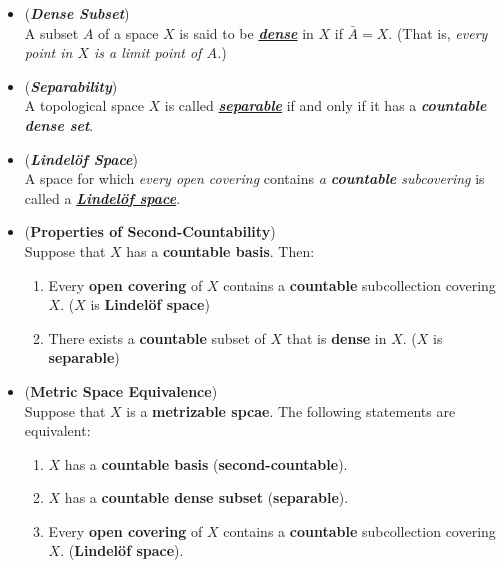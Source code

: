 \documentclass[11pt]{article}
\begin{document}
\begin{itemize}
\item \begin{definition} (\emph{\textbf{Dense Subset}})\\
A subset $A$ of a space $X$ is said to be \underline{\emph{\textbf{dense}}} in $X$ if $\bar{A}=X$. (That is, \emph{every point in $X$ is a limit point of $A$.})
\end{definition}

\item \begin{definition} (\emph{\textbf{Separability}})\\
A topological space $X$ is called \underline{\emph{\textbf{separable}}} if and only if it has a \emph{\textbf{countable dense set}}.
\end{definition}

\item \begin{definition} (\emph{\textbf{Lindel{\"o}f Space}})\\
A space for which \emph{every open covering} contains \emph{a \textbf{countable} subcovering} is called a \underline{\emph{\textbf{Lindel{\"o}f space}}}. 
\end{definition}

\item \begin{proposition} (\textbf{Properties of Second-Countability}) \citep{munkres2000topology}\\
Suppose that $X$ has a \textbf{countable basis}. Then:
\begin{enumerate}
\item Every \textbf{open covering} of $X$ contains a \textbf{countable} subcollection covering $X$. ($X$ is \textbf{Lindel{\"o}f space})
\item There exists a \textbf{countable} subset of $X$ that is \textbf{dense} in $X$. ($X$ is \textbf{separable})
\end{enumerate}
\end{proposition}

\item \begin{proposition}  (\textbf{Metric Space Equivalence}) \citep{munkres2000topology}\\
Suppose that $X$ is a \textbf{metrizable spcae}. The following statements are equivalent: 
\begin{enumerate}
\item $X$ has a \textbf{countable basis} (\textbf{second-countable}).
\item $X$ has a \textbf{countable dense subset} (\textbf{separable}).
\item Every \textbf{open covering} of $X$ contains a \textbf{countable} subcollection covering $X$. (\textbf{Lindel{\"o}f space}).
\end{enumerate}
\end{proposition}


\end{itemize}
\end{document}
